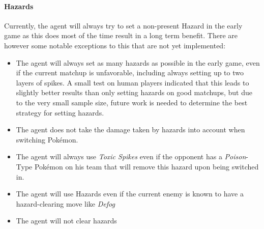 \paragraph{Hazards}
Currently, the agent will always try to set a non-present Hazard in the early game as this does most 
of the time result in a long term benefit. There are however some notable exceptions to this that 
are not yet implemented:
\begin{itemize}
  \item The agent will always set as many hazards as possible in the early game, even if the current matchup 
  is unfavorable, including always setting up to two layers of spikes. A small test on human players indicated
  that this leads to slightly better results than only setting hazards on good matchups, but due to the very
  small sample size, future work is needed to determine the best strategy for setting hazards.
  \item The agent does not take the damage taken by hazards into account when switching Pokémon. 
  \item The agent will always use \textit{Toxic Spikes} even if the opponent has a \textit{Poison}-Type
  Pokémon on his team that will remove this hazard upon being switched in.
  \item The agent will use Hazards even if the current enemy is known to have a hazard-clearing move like
  \textit{Defog} \cite{Bulbapedia:Defog}
  \item The agent will not clear hazards
\end{itemize}


